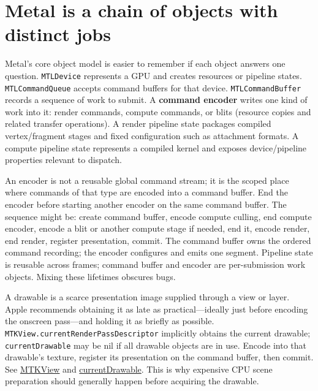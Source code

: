 \section{Metal is a chain of objects with distinct jobs}\label{01-foundations-i-ch011-metal-is-a-chain-of-objects-with-distinct-jobs}

\hypertarget{01-foundations-i-ch011-metal-is-a-chain-of-objects-with-distinct-jobs}{}

Metal's core object model is easier to remember if each object answers one question. \texttt{MTLDevice} represents a GPU and creates resources or pipeline states. \texttt{MTLCommandQueue} accepts command buffers for that device. \texttt{MTLCommandBuffer} records a sequence of work to submit. A \textbf{command encoder} writes one kind of work into it: render commands, compute commands, or blits (resource copies and related transfer operations). A render pipeline state packages compiled vertex/fragment stages and fixed configuration such as attachment formats. A compute pipeline state represents a compiled kernel and exposes device/pipeline properties relevant to dispatch.

An encoder is not a reusable global command stream; it is the scoped place where commands of that type are encoded into a command buffer. End the encoder before starting another encoder on the same command buffer. The sequence might be: create command buffer, encode compute culling, end compute encoder, encode a blit or another compute stage if needed, end it, encode render, end render, register presentation, commit. The command buffer owns the ordered command recording; the encoder configures and emits one segment. Pipeline state is reusable across frames; command buffer and encoder are per-submission work objects. Mixing these lifetimes obscures bugs.

A drawable is a scarce presentation image supplied through a view or layer. Apple recommends obtaining it as late as practical---ideally just before encoding the onscreen pass---and holding it as briefly as possible. \texttt{MTKView.currentRenderPassDescriptor} implicitly obtains the current drawable; \texttt{currentDrawable} may be nil if all drawable objects are in use. Encode into that drawable's texture, register its presentation on the command buffer, then commit. See \href{https://developer.apple.com/documentation/metalkit/mtkview/}{MTKView} and \href{https://developer.apple.com/documentation/MetalKit/MTKView/currentDrawable}{currentDrawable}. This is why expensive CPU scene preparation should generally happen before acquiring the drawable.


